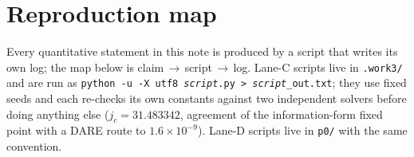 \appendix
\section{Reproduction map}\label{app:repro}

Every quantitative statement in this note is produced by a script that writes its
own log; the map below is claim\,$\to$\,script\,$\to$\,log. Lane-C scripts live in
\texttt{.work3/} and are run as
\texttt{python -u -X utf8 \emph{script}.py > \emph{script}\_out.txt}; they use
fixed seeds and each re-checks its own constants against two independent solvers
before doing anything else ($j_c=31.483342$, agreement of the information-form
fixed point with a DARE route to $1.6\times10^{-9}$). Lane-D scripts live in
\texttt{p0/} with the same convention.

